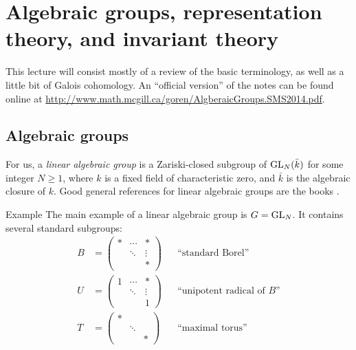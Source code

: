 
\section{Algebraic groups, representation theory, and invariant theory}





This lecture will consist mostly of a review of the basic terminology, as 
well as a little bit of Galois cohomology. An ``official version'' of the 
notes can be found online at 
\url{http://www.math.mcgill.ca/goren/AlgberaicGroups.SMS2014.pdf}. 





\subsection{Algebraic groups}

For us, a \emph{linear algebraic group} is a Zariski-closed subgroup of 
$\operatorname{GL}_N(\bar k)$ for some integer $N\geqslant 1$, where $k$ is a 
fixed field of characteristic zero, and $\bar k$ is the algebraic closure of 
$k$. Good general references for linear algebraic groups are the books 
\cite{b91,gw09,h75,s09}. 

\begin{enonce}[remark]{Example}
The main example of a linear algebraic group is $G=\operatorname{GL}_N$. It 
contains several standard subgroups:
\begin{align*}
  B &= \begin{pmatrix} \ast & \cdots & \ast \\ & \ddots & \vdots \\ & & \ast \end{pmatrix} && \text{``standard Borel''} \\
  U &= \begin{pmatrix} 1 & \cdots & \ast \\ & \ddots & \vdots \\ & & 1\end{pmatrix} && \text{``unipotent radical of $B$''} \\
  T &= \begin{pmatrix} \ast \\ & \ddots \\ & & \ast \end{pmatrix} && \text{``maximal torus''}
\end{align*}
\end{enonce}

